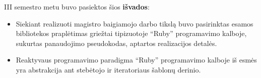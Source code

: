 \documentclass{VUMIFPSmagistrinis}
\begin{document}
III semestro metu buvo pasiektos šios \textbf{išvados}:

\begin{itemize}
  \item Siekiant realizuoti magistro baigiamojo darbo tikslą buvo pasirinktas esamos bibliotekos praplėtimas griežtai tipizuotoje ``Ruby'' programavimo kalboje, sukurtas panaudojimo pseudokodas, aptartos realizacijos detalės.
  \item Reaktyvaus programavimo paradigma ``Ruby'' programavimo kalboje iš esmės yra abstrakcija ant stebėtojo ir iteratoriaus šablonų derinio.


\end{itemize}

\printbibliography[heading=bibintoc]  %




\end{document}
